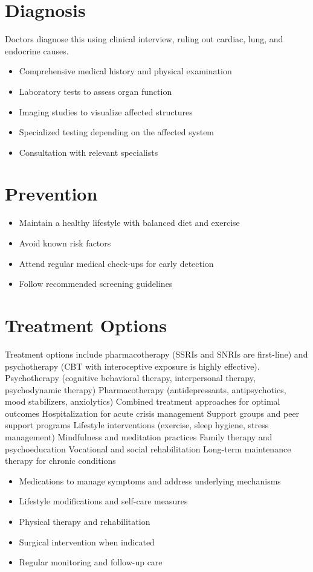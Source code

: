 \section{Diagnosis}
Doctors diagnose this using clinical interview, ruling out cardiac, lung, and endocrine causes.

\begin{itemize}[noitemsep]
  \item Comprehensive medical history and physical examination
  \item Laboratory tests to assess organ function
  \item Imaging studies to visualize affected structures
  \item Specialized testing depending on the affected system
  \item Consultation with relevant specialists
\end{itemize}
\section{Prevention}
\begin{itemize}[noitemsep]
  \item Maintain a healthy lifestyle with balanced diet and exercise
  \item Avoid known risk factors
  \item Attend regular medical check-ups for early detection
  \item Follow recommended screening guidelines
\end{itemize}
\section{Treatment Options}
Treatment options include pharmacotherapy (SSRIs and SNRIs are first-line) and psychotherapy (CBT with interoceptive exposure is highly effective). Psychotherapy (cognitive behavioral therapy, interpersonal therapy, psychodynamic therapy) Pharmacotherapy (antidepressants, antipsychotics, mood stabilizers, anxiolytics) Combined treatment approaches for optimal outcomes Hospitalization for acute crisis management Support groups and peer support programs Lifestyle interventions (exercise, sleep hygiene, stress management) Mindfulness and meditation practices Family therapy and psychoeducation Vocational and social rehabilitation Long-term maintenance therapy for chronic conditions

\begin{itemize}[noitemsep]
  \item Medications to manage symptoms and address underlying mechanisms
  \item Lifestyle modifications and self-care measures
  \item Physical therapy and rehabilitation
  \item Surgical intervention when indicated
  \item Regular monitoring and follow-up care
\end{itemize}
